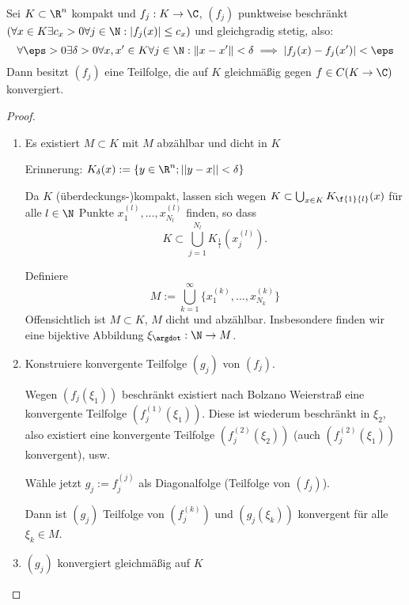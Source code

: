 \begin{st} \label{1.29}
	Sei $K \subset \R^n$ kompakt und $f_j : K \to \C$, $(f_j)$ punktweise beschränkt $(\forall x \in K \exists c_x >0 \forall j\in \N : |f_j(x)|\le c_x)$ und gleichgradig stetig, also:
	\[
		\forall \eps > 0 \exists \delta > 0 \forall x,x' \in K \forall j \in \N : \|x-x'\| < \delta \implies |f_j(x)-f_j(x')| < \eps
	\]
	Dann besitzt $(f_j)$ eine Teilfolge, die auf $K$ gleichmäßig gegen $f\in C(K \to \C)$ konvergiert.
	\begin{proof}
		\begin{enumerate}[1)]
			\item
				Es existiert $M \subset K$ mit $M$ abzählbar und dicht in $K$
				
				  Erinnerung: $ K_\delta(x):= \{y\in \R^n; ||y-x||<\delta \} $
				
				  Da $ K $ (überdeckungs-)kompakt, lassen sich wegen $ K\subset \bigcup_{x\in K} K_{\f{1}{l}}(x) $ für alle $ l\in \N $ Punkte $ x_1^{(l)},..., x^{(l)}_{N_l} $ finden, so dass 
				  \[
				  K\subset \bigcup_{j=1}^{N_l} K_{\frac{1}{l}}(x_j^{(l)}).
				  \]
					
					Definiere
					\[
						M := \bigcup_{k=1}^\infty \Big\{x_1^{(k)}, \dotsc, x_{N_k}^{(k)}\Big\} 
					\]
					Offensichtlich ist $M \subset K$, $M$ dicht und abzählbar. Insbesondere finden wir eine bijektive Abbildung $ \xi_\argdot: \N \to M $.
				
			\item
				Konstruiere konvergente Teilfolge $(g_j)$ von $(f_j)$.
				
					Wegen $(f_j(\xi_1))$ beschränkt existiert nach Bolzano Weierstraß eine konvergente Teilfolge $(f_j^{(1)}(\xi_1))$.
					Diese ist wiederum beschränkt in $\xi_2$, also existiert eine konvergente Teilfolge $(f_j^{(2)}(\xi_2))$ (auch $(f_j^{(2)}(\xi_1))$ konvergent), usw.

					Wähle jetzt $g_j := f_j^{(j)}$ als Diagonalfolge (Teilfolge von $(f_j)$).

					Dann ist $(g_j)$ Teilfolge von $(f_j^{(k)})$ und $(g_j(\xi_k))$ konvergent für alle $\xi_k \in M$.
			\item
				$(g_j)$ konvergiert gleichmäßig auf $K$
				

\end{enumerate}
\end{proof}
\end{st}
